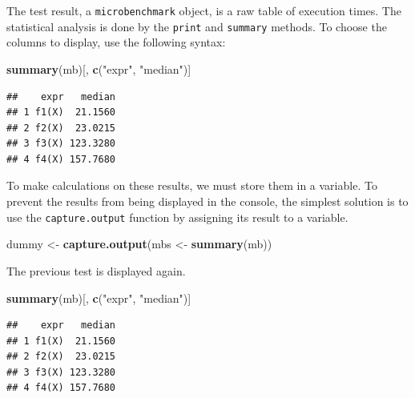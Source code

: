 \documentclass[
  12pt,
  american,
  a4paper,
  extrafontsizes,onecolumn,openright
  ]{memoir}
\newenvironment{Shaded}{\begin{snugshade}}{\end{snugshade}}
\newcommand{\FunctionTok}[1]{\textcolor[rgb]{0.13,0.29,0.53}{\textbf{#1}}}
\newcommand{\NormalTok}[1]{#1}
\newcommand{\OtherTok}[1]{\textcolor[rgb]{0.56,0.35,0.01}{#1}}
\newcommand{\StringTok}[1]{\textcolor[rgb]{0.31,0.60,0.02}{#1}}
\begin{document}
The test result, a \texttt{microbenchmark} object, is a raw table of execution times.
The statistical analysis is done by the \texttt{print} and \texttt{summary} methods.
To choose the columns to display, use the following syntax:

\scriptsize

\begin{Shaded}
\begin{Highlighting}[]
\FunctionTok{summary}\NormalTok{(mb)[, }\FunctionTok{c}\NormalTok{(}\StringTok{"expr"}\NormalTok{, }\StringTok{"median"}\NormalTok{)]}
\end{Highlighting}
\end{Shaded}

\begin{verbatim}
##    expr   median
## 1 f1(X)  21.1560
## 2 f2(X)  23.0215
## 3 f3(X) 123.3280
## 4 f4(X) 157.7680
\end{verbatim}

\normalsize

To make calculations on these results, we must store them in a variable.
To prevent the results from being displayed in the console, the simplest solution is to use the \texttt{capture.output} function by assigning its result to a variable.

\scriptsize

\begin{Shaded}
\begin{Highlighting}[]
\NormalTok{dummy }\OtherTok{\textless{}{-}} \FunctionTok{capture.output}\NormalTok{(mbs }\OtherTok{\textless{}{-}} \FunctionTok{summary}\NormalTok{(mb))}
\end{Highlighting}
\end{Shaded}

\normalsize

The previous test is displayed again.

\scriptsize

\begin{Shaded}
\begin{Highlighting}[]
\FunctionTok{summary}\NormalTok{(mb)[, }\FunctionTok{c}\NormalTok{(}\StringTok{"expr"}\NormalTok{, }\StringTok{"median"}\NormalTok{)]}
\end{Highlighting}
\end{Shaded}

\begin{verbatim}
##    expr   median
## 1 f1(X)  21.1560
## 2 f2(X)  23.0215
## 3 f3(X) 123.3280
## 4 f4(X) 157.7680
\end{verbatim}
\end{document}
